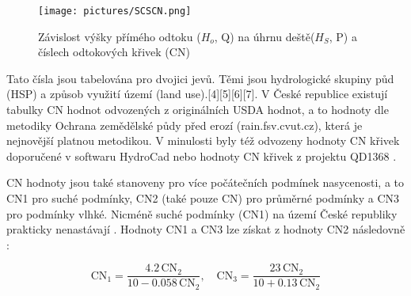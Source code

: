 \documentclass[a4paper,oneside,12pt]{book}
\begin{document}
\begin{figure}[ht] \label{obr1}
\centering
\texttt{[image: pictures/SCSCN.png]}
\caption{ Závislost výšky přímého odtoku ($H_{o}$, Q) na úhrnu deště($H_{S}$, P) a číslech odtokových křivek (CN)  \cite{MNYDGwleJOjKLRU5}}
\label{fig:example}
\end{figure}

 \hspace{10mm} Tato čísla jsou tabelována pro dvojici jevů. Těmi jsou hydrologické skupiny půd (HSP) a způsob využití území (land use).[4][5][6][7]. V České republice existují tabulky CN hodnot odvozených z originálních USDA hodnot, a to hodnoty dle metodiky Ochrana zemědělské půdy před erozí (rain.fsv.cvut.cz), která je nejnovější platnou metodikou\cite{MNYDGwleJOjKdRUp}. V minulosti byly též odvozeny hodnoty CN křivek doporučené v softwaru HydroCad nebo hodnoty CN křivek z projektu QD1368 \cite{Kulasova2004}.

 \hspace{10mm} CN hodnoty jsou také stanoveny pro více počátečních podmínek nasycenosti, a to CN1 pro suché podmínky, CN2 (také pouze CN) pro průměrné podmínky a CN3 pro podmínky vlhké. \cite{dile2016} Nicméně suché podmínky (CN1) na území České republiky prakticky nenastávají \cite{MNYDGwleJOjKdRUp}. Hodnoty CN1 a CN3 lze získat z hodnoty CN2 následovně \cite{Batvari2021}:
 
\begin{equation}
\text{CN}_{1} = \frac{4.2 \, \text{CN}_{2}}{10 - 0.058 \, \text{CN}_{2}}, \quad
\text{CN}_{3} = \frac{23 \, \text{CN}_{2}}{10 + 0.13 \, \text{CN}_{2}}
\end{equation}
\end{document}
